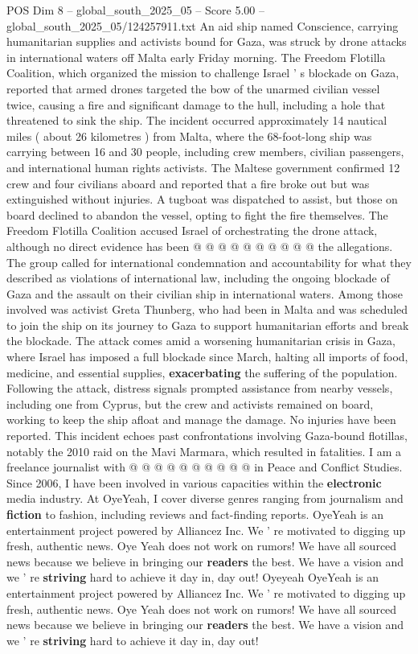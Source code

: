 \begin{textsample}{POS Dim 8 – global\_south\_2025\_05 – Score 5.00 – global\_south\_2025\_05/124257911.txt}  \label{ex:f8_pos_136}
An aid ship named Conscience, carrying humanitarian supplies and activists bound for Gaza, was struck by drone attacks in international waters off Malta early Friday morning.
The Freedom Flotilla Coalition, which organized the mission to challenge Israel ' s blockade on Gaza, reported that armed drones targeted the bow of the unarmed civilian vessel twice, causing a fire and significant damage to the hull, including a hole that threatened to sink the ship.
The incident occurred approximately 14 nautical miles ( about 26 kilometres ) from Malta, where the 68-foot-long ship was carrying between 16 and 30 people, including crew members, civilian passengers, and international human rights activists.
The Maltese government confirmed 12 crew and four civilians aboard and reported that a fire broke out but was extinguished without injuries.
A tugboat was dispatched to assist, but those on board declined to abandon the vessel, opting to fight the fire themselves.
The Freedom Flotilla Coalition accused Israel of orchestrating the drone attack, although no direct evidence has been @ @ @ @ @ @ @ @ @ @ the allegations.
The group called for international condemnation and accountability for what they described as violations of international law, including the ongoing blockade of Gaza and the assault on their civilian ship in international waters.
Among those involved was activist Greta Thunberg, who had been in Malta and was scheduled to join the ship on its journey to Gaza to support humanitarian efforts and break the blockade.
The attack comes amid a worsening humanitarian crisis in Gaza, where Israel has imposed a full blockade since March, halting all imports of food, medicine, and essential supplies, \textbf{exacerbating} the suffering of the population.
Following the attack, distress signals prompted assistance from nearby vessels, including one from Cyprus, but the crew and activists remained on board, working to keep the ship afloat and manage the damage.
No injuries have been reported.
This incident echoes past confrontations involving Gaza-bound flotillas, notably the 2010 raid on the Mavi Marmara, which resulted in fatalities.
I am a freelance journalist with @ @ @ @ @ @ @ @ @ @ in Peace and Conflict Studies.
Since 2006, I have been involved in various capacities within the \textbf{electronic} media industry.
At OyeYeah, I cover diverse genres ranging from journalism and \textbf{fiction} to fashion, including reviews and fact-finding reports.
OyeYeah is an entertainment project powered by Alliancez Inc.
We ' re motivated to digging up fresh, authentic news.
Oye Yeah does not work on rumors!
We have all sourced news because we believe in bringing our \textbf{readers} the best.
We have a vision and we ' re \textbf{striving} hard to achieve it day in, day out!
Oyeyeah OyeYeah is an entertainment project powered by Alliancez Inc.
We ' re motivated to digging up fresh, authentic news.
Oye Yeah does not work on rumors!
We have all sourced news because we believe in bringing our \textbf{readers} the best.
We have a vision and we ' re \textbf{striving} hard to achieve it day in, day out!

\end{textsample}
